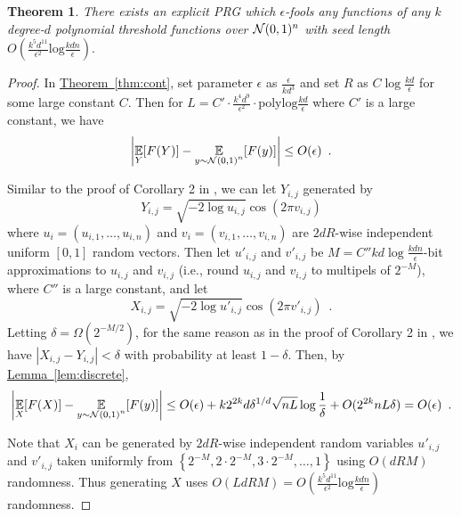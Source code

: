 \documentclass[12pt]{article}
\newtheorem{theorem}{Theorem}[section]
\newcommand{\lem}[1]{\hyperref[lem:#1]{Lemma~\ref*{lem:#1}}}
\newcommand{\thm}[1]{\hyperref[thm:#1]{Theorem~\ref*{thm:#1}}}
\newcommand{\br}[1]{\left(#1\right)} \newcommand{\Br}[1]{\left[#1\right]} \newcommand{\st}[1]{\left\{#1\right\}} \newcommand{\tr}[1]{\mathrm{Tr}\!\Br{#1}} \newcommand{\abs}[1]{\left|#1 \right|} \newcommand{\norm}[1]{\left\lVert #1 \right\rVert} \newcommand{\agl}[2]{\theta^{\br{#1}}_{#2}} \newcommand{\aglp}[2]{{\theta'}^{\br{#1}}_{#2}} \newcommand{\lint}[1]{\left\lfloor#1\right\rfloor} \newcommand{\poly}[1]{\mathrm{poly}\!\br{#1}} \newcommand{\negl}[1]{\mathrm{negl}\!\br{#1}} \newcommand{\de}[1]{\mathrm{d}#1} \newcommand{\val}[1]{\mathrm{val}\!\br{#1}} \newcommand{\vall}[1]{\mathrm{val}\br{#1}} \newcommand{\nd}[1]{\mathcal{N}\!\br{#1}} \newcommand{\ketbratwo}[2]{\ket{#1} \hspace{-0.4em}\bra{#2}} \newcommand{\ketbra}[1]{\ketbratwo{#1}{#1}} \newcommand{\id}{\ensuremath{\mathds{1}}} \newcommand{\ogroup}[1]{\mathrm{O}\!\br{#1}} \newcommand{\ugroup}[1]{\mathrm{U}\!\br{#1}} \newcommand{\td}{\mathrm{TD}} \newcommand{\tv}[1]{\norm{#1}_{\mathrm{TV}}} \newcommand {\defeq} {\ensuremath{ \stackrel{\mathrm{def}}{=} }} \newcommand{\vdim}{\ensuremath{N}} \newcommand{\dimin}{\ensuremath{n}} \newcommand{\dimout}{\ensuremath{m}} \newcommand{\ncopy}{\ell} \newcommand{\hspacein}{\H_\mathrm{in}} \newcommand{\hspaceout}{\H_\mathrm{out}} \newcommand{\Sin}{\S(\hspacein)} \newcommand{\Sout}{\S(\hspaceout)} \newcommand{\haar}{\ensuremath{\mu}} \newcommand{\tensorhaar}{\ensuremath{\eta}} \newcommand{\tensorsrss}{\ensuremath{\nu}} \newcommand{\qadvice}{\ensuremath{\rho}} \newcommand{\tp}{\otimes} \newcommand{\wone}[2]{W_1\!\br{#1,#2}}
\begin{document}
\begin{theorem}\label{thm:main_formal}
	There exists an explicit PRG which $\epsilon$-fools any functions of any $k$ degree-$d$ polynomial threshold functions over $\mathcal{N}(0,1)^n$ with seed length
	$
		O\br{\frac{k^5d^{11}}{\epsilon^{2}} \mathrm{log}\frac{kdn}{\epsilon} } .	
	$
\end{theorem}

\begin{proof}
	In \thm{cont}, set parameter $\epsilon$ as $\frac{\epsilon}{kd^3}$ and set $R$ as $C\log\frac{kd}{\epsilon}$ for some large constant $C$.
	Then for $L = C'\cdot \frac{k^4d^9}{\epsilon^2}\cdot \mathrm{polylog}\frac{kd}{\epsilon}$ where $C'$ is a large constant, we have
	\[
	\abs{
		\expect{Y}{
			F(Y)	
		}
		-
		\expect{y\sim\NN\br{0,1}^n}{
			F(y)
		}
	}\leq O(\epsilon) \enspace .
	\]
	
	Similar to the proof of Corollary 2 in \cite{Kan11b},
	we can let $Y_{i,j}$ generated by 
	\[
		Y_{i,j} = \sqrt{-2 \log u_{i,j}}\cos(2\pi v_{i,j})
	\]
	where $u_i = (u_{i,1},\dots,u_{i,n}) $ and $v_i= (v_{i,1},\dots,v_{i,n})$ are $2dR$-wise independent uniform $[0,1]$ random vectors.
	Then let $u'_{i,j}$ and $v'_{i,j}$ be $M = C''kd\log\frac{kdn}{\epsilon}$-bit approximations to  $u_{i,j}$ and $v_{i,j}$
	(i.e., round $u_{i,j}$ and $v_{i,j}$ to multipels of $2^{-M}$), where $C''$ is a large constant, and let
	\[
		X_{i,j} = \sqrt{-2 \log u'_{i,j}}\cos(2\pi v'_{i,j})\enspace .
	\]
	Letting $\delta = \Omega(2^{-M/2})$, for the same reason as in the proof of Corollary 2 in \cite{Kan11b}, we have
	$\abs{X_{i,j}-Y_{i,j}}<\delta$ with probability at least $1-\delta$.
	Then, by \lem{discrete},
	\[
	\abs{
		\expect{X}{
			F(X)	
		}
		-
		\expect{y\sim\NN\br{0,1}^n}{
			F(y)
		}
	}\leq O(\epsilon) + k 2^{2k}d \delta^{1/d} \sqrt{nL} \log\frac{1}{\delta}  + O(2^{2k}nL\delta)  = O(\epsilon)\enspace .
	\]


	Note that $X_i$ can be generated by $2dR$-wise independent random variables $u'_{i,j}$ and $v'_{i,j}$ taken uniformly from $\st{2^{-M}, 2\cdot 2^{-M}, 3\cdot 2^{-M},\dots,1}$ using $O(dRM)$ randomness.
	Thus generating $X$ uses $O(LdRM) =
	O\br{\frac{k^5d^{11}}{\epsilon^{2}} \mathrm{log}\frac{kdn}{\epsilon} }$ randomness.
	


\end{proof}
\end{document}
